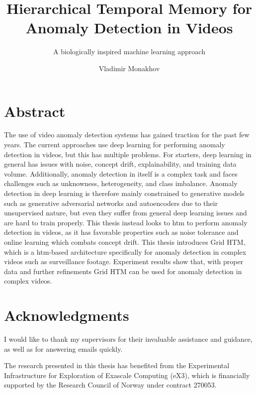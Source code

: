 \documentclass[USenglish]{ifimaster}  %
\title{Hierarchical Temporal Memory for Anomaly Detection in Videos}
\subtitle{A biologically inspired machine learning approach }         %
\author{Vladimir Monakhov}                      %
\begin{document}
\duoforside[
  dept={Department of Informatics},   %
  program={Informatics: Robotics and Intelligent Systems},         %
  long
]                                        %

\frontmatter{}
\chapter*{Abstract} 
The use of video anomaly detection systems has gained traction for the past few years. The current approaches use deep learning for performing anomaly detection in videos, but this has multiple problems. For starters, deep learning in general has issues with noise, concept drift, explainability, and training data volume. Additionally, anomaly detection in itself is a complex task and faces challenges such as unknowness, heterogeneity, and class imbalance. Anomaly detection in deep learning is therefore mainly constrained to generative models such as generative adversarial networks and autoencoders due to their unsupervised nature, but even they suffer from general deep learning issues and are hard to train properly. This thesis instead looks to \gls*{htm} to perform anomaly detection in videos, as it has favorable properties such as noise tolerance and online learning which combats concept drift. This thesis introduces Grid HTM, which is a \gls*{htm}-based architecture specifically for anomaly detection in complex videos such as surveillance footage. Experiment results show that, with proper data and further refinements Grid HTM can be used for anomaly detection in complex videos.

\chapter*{Acknowledgments} 
I would like to thank my supervisors for their invaluable assistance and guidance, as well as for answering emails quickly.
\par
The research presented in this thesis has benefited from the Experimental Infrastructure for Exploration of Exascale Computing (eX3), which is financially supported by the Research Council of Norway under contract 270053.

\tableofcontents
\listoffigures
\listoftables
\mainmatter{}
\glsresetall





\backmatter{}
\printbibliography
\end{document}
